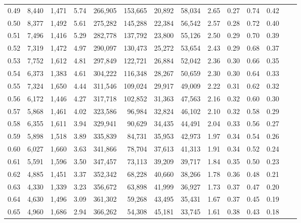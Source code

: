 \begin{tabular}{rrrrrrrrrrrrrr}
0.49 &   8,440 &  1,471 &    5.74 &  266,905 &  153,665 &  20,892 &  58,034 &  2.65 &  0.27 &  0.74 &      0.42 \\
0.50 &   8,377 &  1,492 &    5.61 &  275,282 &  145,288 &  22,384 &  56,542 &  2.57 &  0.28 &  0.72 &      0.40 \\
0.51 &   7,496 &  1,416 &    5.29 &  282,778 &  137,792 &  23,800 &  55,126 &  2.50 &  0.29 &  0.70 &      0.39 \\
0.52 &   7,319 &  1,472 &    4.97 &  290,097 &  130,473 &  25,272 &  53,654 &  2.43 &  0.29 &  0.68 &      0.37 \\
0.53 &   7,752 &  1,612 &    4.81 &  297,849 &  122,721 &  26,884 &  52,042 &  2.36 &  0.30 &  0.66 &      0.35 \\
0.54 &   6,373 &  1,383 &    4.61 &  304,222 &  116,348 &  28,267 &  50,659 &  2.30 &  0.30 &  0.64 &      0.33 \\
0.55 &   7,324 &  1,650 &    4.44 &  311,546 &  109,024 &  29,917 &  49,009 &  2.22 &  0.31 &  0.62 &      0.32 \\
0.56 &   6,172 &  1,446 &    4.27 &  317,718 &  102,852 &  31,363 &  47,563 &  2.16 &  0.32 &  0.60 &      0.30 \\
0.57 &   5,868 &  1,461 &    4.02 &  323,586 &   96,984 &  32,824 &  46,102 &  2.10 &  0.32 &  0.58 &      0.29 \\
0.58 &   6,355 &  1,611 &    3.94 &  329,941 &   90,629 &  34,435 &  44,491 &  2.04 &  0.33 &  0.56 &      0.27 \\
0.59 &   5,898 &  1,518 &    3.89 &  335,839 &   84,731 &  35,953 &  42,973 &  1.97 &  0.34 &  0.54 &      0.26 \\
0.60 &   6,027 &  1,660 &    3.63 &  341,866 &   78,704 &  37,613 &  41,313 &  1.91 &  0.34 &  0.52 &      0.24 \\
0.61 &   5,591 &  1,596 &    3.50 &  347,457 &   73,113 &  39,209 &  39,717 &  1.84 &  0.35 &  0.50 &      0.23 \\
0.62 &   4,885 &  1,451 &    3.37 &  352,342 &   68,228 &  40,660 &  38,266 &  1.78 &  0.36 &  0.48 &      0.21 \\
0.63 &   4,330 &  1,339 &    3.23 &  356,672 &   63,898 &  41,999 &  36,927 &  1.73 &  0.37 &  0.47 &      0.20 \\
0.64 &   4,630 &  1,496 &    3.09 &  361,302 &   59,268 &  43,495 &  35,431 &  1.67 &  0.37 &  0.45 &      0.19 \\
0.65 &   4,960 &  1,686 &    2.94 &  366,262 &   54,308 &  45,181 &  33,745 &  1.61 &  0.38 &  0.43 &      0.18 \\

\end{tabular}
